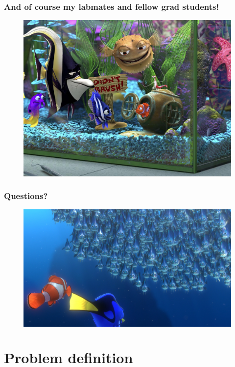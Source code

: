 \documentclass{beamer}
\begin{document}
\begin{frame}
  \frametitle{And of course my labmates and fellow grad students!}
  \begin{figure}
  \centering
  \includegraphics[width=\linewidth]{labmates}
  \end{figure}
\end{frame}

\begin{frame}
  \frametitle{Questions?}
  \begin{figure}
  \centering
  \includegraphics[width=\linewidth]{questions}
  \end{figure}
\end{frame}

\section{Problem definition}
\end{document}

